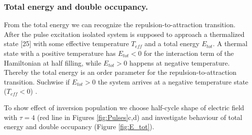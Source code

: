 
\subsubsection{Total energy and double occupancy.}

From the total energy we can recognize the repulsion-to-attraction transition. After the pulse excitation isolated system is supposed to approach a thermalized state [25] with some effective temperature $T_{eff}$ and a total energy $E_{tot}$. A thermal state with a positive temperature has $E_{tot} < 0$ for the interaction term of the Hamiltonian at half filling, while $E_{tot} > 0$ happens at negative temperature. Thereby the total energy is an order parameter for the repulsion-to-attraction transition. Suchwise if $E_{tot} > 0$ the system arrives at a negative temperature state ($T_{eff} < 0$) \citet{PhysRevB.85.155124}.

To show effect of inversion population we choose half-cycle shape of electric field with $\tau = 4$ (red line in Figures \ref{fig:Pulses}c,d) and investigate behaviour of total energy and double occupancy (Figure \ref{fig:E_tot}).

